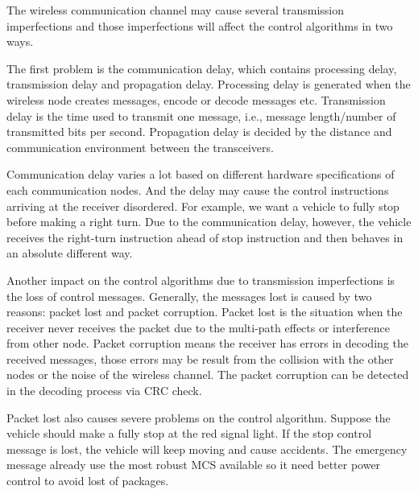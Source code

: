 
The wireless communication channel may cause several transmission 	imperfections and those imperfections will affect the control algorithms in two ways. 

The first problem is the communication delay, which contains processing delay, transmission delay and propagation delay. Processing delay is generated when the wireless node creates messages, encode or decode messages etc. Transmission delay is the time used to transmit one message, i.e., message length/number of transmitted bits per second. Propagation delay is decided by the distance and communication environment between the transceivers. 

Communication delay varies a lot based on different hardware specifications of each communication nodes. And the delay may cause the control instructions arriving at the receiver disordered. For example, we want a vehicle to fully stop before making a right turn. Due to the communication delay, however, the vehicle receives the right-turn instruction ahead of stop instruction and then behaves in an absolute different way. 

Another impact on the control algorithms due to transmission imperfections is the loss of control messages. Generally, the messages lost is caused by two reasons: packet lost and packet corruption. Packet lost is the situation when the receiver never receives the packet due to the multi-path effects or interference from other node. Packet corruption means the receiver has errors in decoding the received messages, those errors may be result from the collision with the other nodes or the noise of the wireless channel. The packet corruption can be detected in the decoding process via CRC check. 

Packet lost also causes severe problems on the control algorithm. Suppose the vehicle should make a fully stop at the red signal light. If the stop control message is lost, the vehicle will keep moving and cause accidents. The emergency message already use the most robust MCS available so  it need better power control to avoid lost of packages.  